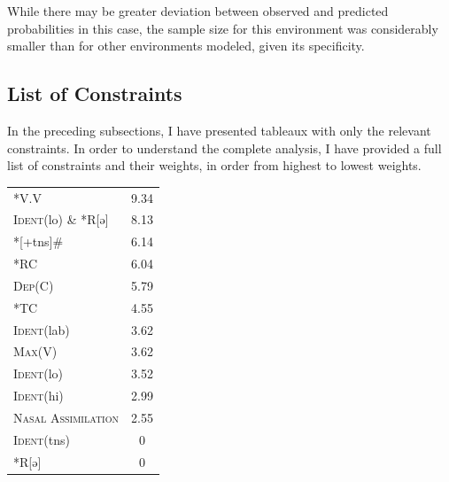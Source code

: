 \documentclass[output=paper,newtxmath,modfonts,nonflat,draftmode]{langsci/langscibook}
\begin{document}
\begin{table}
\caption{Tableau for /ma\#C/ with sample phrase ‘food hits’, $n=6$}
\label{tab:baird:9}
\footnotesize
{}
\end{table}

While there may be greater deviation between observed and predicted probabilities in this case, the sample size for this environment was considerably smaller than for other environments modeled, given its specificity.

\subsection {List of Constraints} \label{fulllist}

In the preceding subsections, I have presented tableaux with only the relevant constraints. In order to understand the complete analysis, I have provided a full list of constraints and their weights, in order from highest to lowest weights. 

\ea
\begin{tabular}[t]{lS}
	*V.V &  9.34 \\
	\textsc{Ident}(lo) \&  *R[ə] &  8.13 \\
	*[+tns]\# &  6.14 \\
	*RC &  6.04\\
	\textsc{Dep}(C) &  5.79\\
	*TC &  4.55\\
	\textsc{Ident}(lab) &  3.62\\
	\textsc{Max}(V) &  3.62\\
	\textsc{Ident}(lo) &  3.52\\
	\textsc{Ident}(hi) &  2.99\\
	\textsc{Nasal Assimilation} &  2.55\\
	\textsc{Ident}(tns) &  0\\
	*R[ə] &  0\\
\end{tabular}
\z{}
\end{document}
